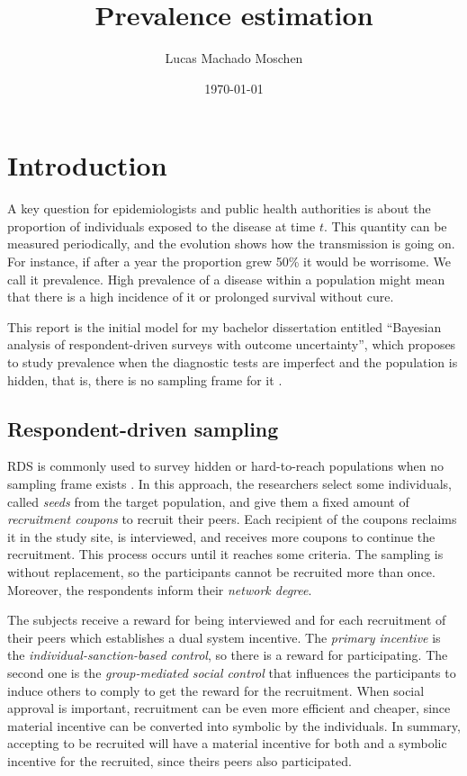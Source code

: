 \documentclass[a4paper, notitlepage, 11pt]{article}
\title{Prevalence estimation}
\author{Lucas Machado Moschen}
\affil{School of Applied Mathematics, \\ Fundação Getulio Vargas}
\date{\today}
\theoremstyle{definition}
\theoremstyle{remark}
\begin{document}
\maketitle

\section{Introduction}

A key question for epidemiologists and public health authorities is about the
proportion of individuals exposed to the disease at time $t$. This quantity
can be measured periodically, and the evolution shows how the transmission is
going on. For instance, if after a year the proportion grew 50\% it would be
worrisome. We call it prevalence. High prevalence of a disease within a
population might mean that there is a high incidence of it or prolonged
survival without cure. 

This report is the initial model for my bachelor dissertation entitled ``Bayesian analysis of respondent-driven surveys with
outcome uncertainty'', which proposes to study prevalence when the diagnostic
tests are imperfect and the population is hidden, that is, there is no
sampling frame for it \cite{heckathorn1997}. 

\subsection{Respondent-driven sampling}

RDS is commonly used to survey hidden or hard-to-reach populations when
no sampling frame exists \cite{heckathorn1997}. In this approach, the
researchers select some individuals, called {\em seeds} from the target
population, and give them a fixed amount of {\em recruitment coupons} to
recruit their peers. Each recipient of the coupons reclaims it in the study
site, is interviewed, and receives more coupons to continue the recruitment.
This process occurs until it reaches some criteria. The sampling is without
replacement, so the participants cannot be recruited more than once. Moreover,
the respondents inform their {\em network degree}.

The subjects receive a reward for being interviewed and for each recruitment
of their peers which establishes a dual system incentive. The {\em primary incentive} is the
{\em individual-sanction-based control}, so there is a reward for
participating. The second one is the {\em group-mediated social control} that
influences the participants to induce others to comply to get the reward for the recruitment. When social approval is important, recruitment can be even
more efficient and cheaper, since material incentive can be converted into
symbolic by the individuals. In summary, accepting to be recruited will have a
material incentive for both and a symbolic incentive for the recruited, since
theirs peers also participated.
\end{document}
